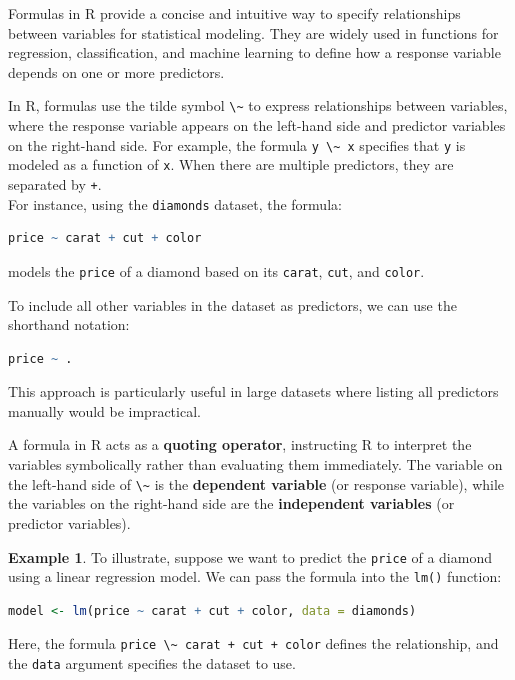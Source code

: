 \documentclass[
  11pt,
]{book}
\newcommand{\passthrough}[1]{#1}
\theoremstyle{definition}
\theoremstyle{definition}
\newtheorem{example}{Example}[chapter]
\theoremstyle{definition}
\theoremstyle{definition}
\theoremstyle{remark}
\begin{document}
Formulas in R provide a concise and intuitive way to specify relationships between variables for statistical modeling. They are widely used in functions for regression, classification, and machine learning to define how a response variable depends on one or more predictors.

In R, formulas use the tilde symbol \passthrough{\lstinline!\~!} to express relationships between variables, where the response variable appears on the left-hand side and predictor variables on the right-hand side. For example, the formula \passthrough{\lstinline!y \~ x!} specifies that \passthrough{\lstinline!y!} is modeled as a function of \passthrough{\lstinline!x!}. When there are multiple predictors, they are separated by \passthrough{\lstinline!+!}.\\
For instance, using the \passthrough{\lstinline!diamonds!} dataset, the formula:

\begin{lstlisting}[language=R]
price ~ carat + cut + color
\end{lstlisting}

models the \passthrough{\lstinline!price!} of a diamond based on its \passthrough{\lstinline!carat!}, \passthrough{\lstinline!cut!}, and \passthrough{\lstinline!color!}.

To include all other variables in the dataset as predictors, we can use the shorthand notation:

\begin{lstlisting}[language=R]
price ~ .
\end{lstlisting}

This approach is particularly useful in large datasets where listing all predictors manually would be impractical.

A formula in R acts as a \textbf{quoting operator}, instructing R to interpret the variables symbolically rather than evaluating them immediately. The variable on the left-hand side of \passthrough{\lstinline!\~!} is the \textbf{dependent variable} (or response variable), while the variables on the right-hand side are the \textbf{independent variables} (or predictor variables).

\begin{example}
\protect\hypertarget{exm:ex-formula}{}\label{exm:ex-formula}To illustrate, suppose we want to predict the \passthrough{\lstinline!price!} of a diamond using a linear regression model. We can pass the formula into the \passthrough{\lstinline!lm()!} function:

\begin{lstlisting}[language=R]
model <- lm(price ~ carat + cut + color, data = diamonds)
\end{lstlisting}

Here, the formula \passthrough{\lstinline!price \~ carat + cut + color!} defines the relationship, and the \passthrough{\lstinline!data!} argument specifies the dataset to use.
\end{example}
\end{document}
